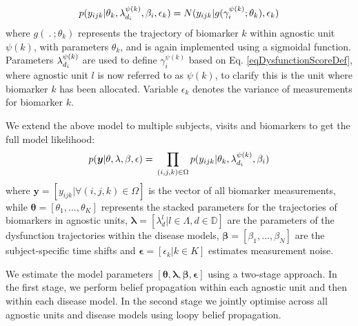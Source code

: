 \documentclass{llncs}
\begin{document}
\begin{equation}
 p(y_{ijk}|\theta_k, \lambda_{d_i}^{\psi(k)}, \beta_i, \epsilon_k) = N(y_{ijk}| g( \gamma_i^{\psi(k)} ; \theta_k), \epsilon_k)
\end{equation}
where $g(\ .\ ; \theta_k)$ represents the trajectory of biomarker $k$ within agnostic unit $\psi(k)$, with parameters $\theta_k$, and is again implemented using a sigmoidal function. Parameters $\lambda_{d_i}^{\psi(k)}$ are used to define $\gamma_i^{\psi(k)}$ based on Eq. \ref{eqDysfunctionScoreDef}, where agnostic unit $l$ is now referred to as $\psi(k)$, to clarify this is the unit where biomarker $k$ has been allocated. Variable $\epsilon_k$ denotes the variance of measurements for biomarker $k$.


We extend the above model to multiple subjects, visits and biomarkers to get the full model likelihood:
\begin{equation}
 p(\boldsymbol{y}|\theta, \lambda, \beta , \epsilon) = \\ \prod_{(i,j,k) \in \Omega} p(y_{ijk}|\theta_k, \lambda_{d_i}^{\psi(k)}, \beta_i) 
\end{equation}
where $\boldsymbol{y} = [y_{ijk} | \forall (i,j,k) \in \Omega ]$ is the vector of all biomarker measurements, while $\boldsymbol{\theta} = [\theta_1, ..., \theta_K]$ represents the stacked parameters for the trajectories of biomarkers in agnostic units, $\boldsymbol{\lambda} = [\lambda_d^{l}|l \in \Lambda, d \in \mathbb{D}]$ are the parameters of the dysfunction trajectories within the disease models, $\boldsymbol{\beta} =[\beta_1, ..., \beta_N]$ are the subject-specific time shifts and $\boldsymbol{\epsilon} = [\epsilon_k | k \in K]$ estimates measurement noise. 

We estimate the model parameters $[\boldsymbol{\theta}, \boldsymbol{\lambda}, \boldsymbol{\beta}, \boldsymbol{\epsilon}]$ using a two-stage approach. In the first stage, we perform belief propagation within each agnostic unit and then within each disease model. In the second stage we jointly optimise across all agnostic units and disease models using loopy belief propagation. 


%
\end{document}
